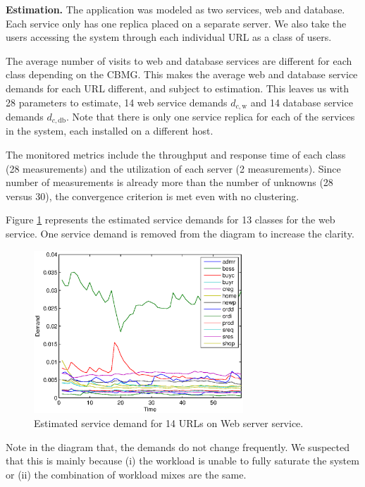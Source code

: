  \textbf{Estimation.} 
    The application was modeled as two services, web and database. Each service only has one replica placed on a separate server. We also take the users accessing the system through each individual URL as a class of users. 
    
		The average number of visits to web and database services are different for each class depending on the CBMG. This makes the average web and database service demands for each URL different, and subject to estimation. This leaves us with 28 parameters to estimate, 14 web service demands $d_{c,\text{w}}$ and 14 database service demands $d_{c,\text{db}}$. Note that there is only one service replica for each of the services in the system, each installed on a different host.
		
		The monitored metrics include the throughput and response time of each class (28 measurements) and the utilization of each server (2 measurements). Since number of measurements is already more than the number of unknowns (28 versus 30), the convergence criterion is met even with no clustering.

		Figure \ref{fig:estimated-demands-casestudy1} represents the estimated  service demands for 13 classes for the web service. One service demand is removed  from the diagram to increase the clarity. 
 \begin{figure}[htbp]
	\centering
	\includegraphics[width=0.7\textwidth]{image/demand13_estimated_kamlan.eps}
	\caption[A sample example of estimated service demand of 14 classes on a single service.]{Estimated service demand for 14  URLs on Web server service.}
	\label{fig:estimated-demands-casestudy1}
\end{figure}
Note in the diagram that, the demands do not change frequently. We suspected that this is mainly because (i) the workload is unable to fully saturate the system or (ii) the combination of workload mixes are the same.
      
